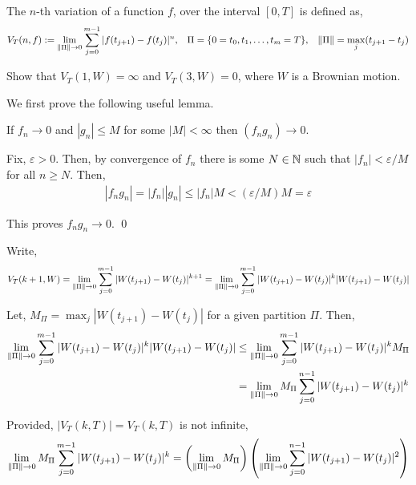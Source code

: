 \pagebreak
\begin{problem}[Exercise 7.3]
    The \( n \)-th variation of a function \( f \), over the interval \( [0,T] \) is defined as,
    \begin{align*}
        V_T(n,f) := 
        \lim_{\left\lVert\Pi\right\rVert\to 0} \sum_{j=0}^{m-1} |f(t_{j+1})-f(t_j)|^n, && \Pi = \{0=t_0,t_1, \ldots, t_m=T\}, && \left\lVert\Pi\right\rVert = \max_j(t_{j+1}-t_{j})
    \end{align*}

    Show that \( V_T(1,W) = \infty \) and \( V_T(3,W) = 0 \), where \( W \) is a Brownian motion.
\end{problem}


\begin{solution}[Solution]
We first prove the following useful lemma.
\begin{lemma}
    If \( f_n \to 0 \) and \( |g_n| \leq M \) for some \( |M| < \infty \) then \( (f_ng_n)\to 0 \).
\end{lemma}
Fix, \( \varepsilon > 0 \). Then, by convergence of \( f_n \) there is some \( N\in\mathbb{N} \) such that \( |f_n| < \varepsilon/M \) for all \( n\geq N \). Then,
\begin{align*}
    |f_ng_n| = |f_n||g_n| \leq |f_n|M < (\varepsilon/M)M = \varepsilon
\end{align*}

This proves \( f_ng_n \to 0 \). \qed


Write,
\begin{align*}
    V_T(k+1,W) = 
    \lim_{\left\lVert\Pi\right\rVert\to 0} \sum_{j=0}^{m-1} |W(t_{j+1})-W(t_j)|^{k+1} = 
    \lim_{\left\lVert\Pi\right\rVert\to 0} \sum_{j=0}^{m-1} |W(t_{j+1})-W(t_j)|^k|W(t_{j+1})-W(t_j)|
\end{align*}

Let, \( M_\Pi = \max_j |W(t_{j+1}) - W(t_j)| \) for a given partition \( \Pi \). Then,
\begin{align*}
    \lim_{\left\lVert\Pi\right\rVert\to 0} \sum_{j=0}^{m-1} |W(t_{j+1})-W(t_j)|^k|W(t_{j+1})-W(t_j)| 
    &\leq \lim_{\left\lVert\Pi\right\rVert\to 0} \sum_{j=0}^{m-1} |W(t_{j+1})-W(t_j)|^k M_\Pi 
    \\&= \lim_{\left\lVert\Pi\right\rVert\to 0} M_\Pi \sum_{j=0}^{n-1} |W(t_{j+1})-W(t_j)|^k
\end{align*}

Provided, \( |V_T(k,T)| = V_T(k,T) \) is not infinite,
\begin{align*}
    \lim_{\left\lVert\Pi\right\rVert\to 0} M_\Pi \sum_{j=0}^{m-1} |W(t_{j+1})-W(t_j)|^k
    = \left( \lim_{\left\lVert\Pi\right\rVert\to 0} M_\Pi \right) \left( \lim_{\left\lVert\Pi\right\rVert\to 0} \sum_{j=0}^{n-1} |W(t_{j+1})-W(t_j)|^2 \right)
\end{align*}


\end{solution}
